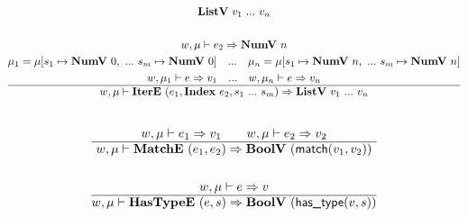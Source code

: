 \begin{gather*}
  \listv ~ v_1 ~ ... ~ v_n \\
%
\newline \\
  w, \mu \vdash e_2 \Rightarrow \numv ~ n \\
  \mu_1 = \mu[s_1 \mapsto \numv ~ 0, ~ ... ~ s_m \mapsto \numv ~ 0] \quad ... \quad
  \mu_n = \mu[s_1 \mapsto \numv ~ n, ~ ... ~ s_m \mapsto \numv ~ n] \\
  w, \mu_1 \vdash e \Rightarrow v_1 \quad ... \quad
  w, \mu_n \vdash e \Rightarrow v_n \\
  \hline
  w, \mu \vdash \itere ~ (e_1, \listidxiter ~ e_2, s_1 ~ ... ~ s_m) \Rightarrow
  \listv ~ v_1 ~ ... ~ v_n \\
\end{gather*}
\newpage
\begin{gather*}
%
\newline \\
  w, \mu \vdash e_1 \Rightarrow v_1 \qquad
  w, \mu \vdash e_2 \Rightarrow v_2 \\
  \hline
  w, \mu \vdash \matche ~ (e_1, e_2) \Rightarrow \boolv ~ (\match(v_1, v_2)) \\
%
\newline \\
  w, \mu \vdash e \Rightarrow v \\
  \hline
  w, \mu \vdash \hastypee ~ (e, s) \Rightarrow \boolv ~ (\hastype(v, s)) \\
\end{gather*}

